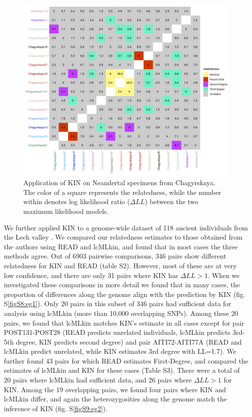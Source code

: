 \documentclass[12pt, letterpaper]{article}
\begin{document}
\begin{figure}[h!]
    \includegraphics[width=18cm]{plots/inkscape_finalImg/kinplot.png}
    \centering
    \caption{Application of KIN on Neandertal specimens from Chagyrskaya. The color of a square represents the relatedness, while the number within denotes log likelihood ratio ($\Delta LL$) between the two maximum likelihood models.}
    \label{fig5:Chagyrskaya_KIN}
\end{figure}

We further applied KIN to a genome-wide dataset of 118 ancient individuals from the Lech valley \cite{mittnik_kinship-based_2019}. We compared our relatedness estimates to those obtained from the authors using READ and lcMLkin, and found that in most cases the three methods agree. Out of 6903 pairwise comparisons, 346 pairs show different relatedness for KIN and READ (table S2). However, most of these are at very low confidence, and there are only 31 pairs where KIN has $\Delta LL>1$. When we investigated these comparisons in more detail we found that in many cases, the proportion of differences along the genome align with the prediction by KIN (fig. S\ref{figS8:eg1}). Only 20 pairs in this subset of 346 pairs had sufficient data for analysis using lcMLkin (more than 10,000 overlapping SNPs). Among these 20 pairs, we found that lcMLkin matches KIN's estimate in all cases except for pair POST131-POST28 (READ predicts unrelated individuals, lcMLkin predicts 3rd-5th degree, KIN predicts second degree) and pair AITI72-AITI77A (READ and lcMLkin predict unrelated, while KIN estimates 3rd degree with LL=1.7).  
We further found 43 pairs for which READ estimates First-Degree, and compared the estimates of lcMLkin and KIN for these cases (Table S3). There were a total of 20 pairs where lcMLkin had sufficient data, and 26 pairs where $\Delta LL>1$ for KIN. Among the 19 overlapping pairs, we found four pairs where KIN and lcMLkin differ, and again the heterozygosities along the genome match the inference of KIN (fig. S\ref{figS9:eg2}).  
\end{document}
